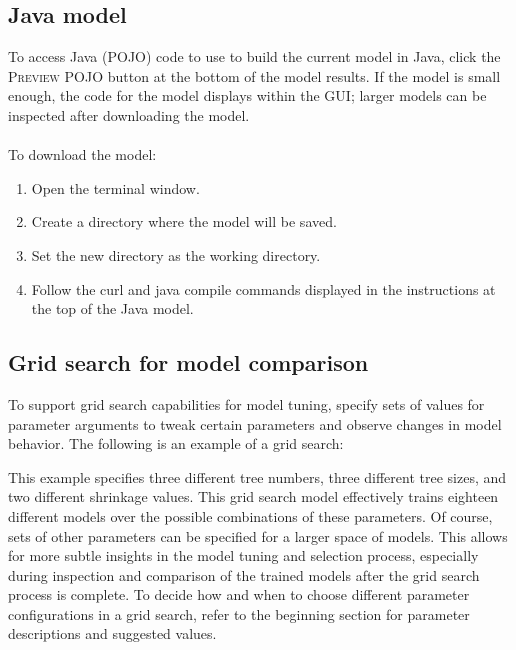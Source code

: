 \subsection{Java model}

To access Java (POJO) code to use to build the current model in Java, click the \textsc{Preview POJO} button at the
bottom of the model results. If the model is small enough, the code for the model displays within the GUI; larger
models can be inspected after downloading the model.
\\
\\
To download the model:
\begin{enumerate}
\item Open the terminal window.
\item Create a directory where the model will be saved.
\item Set the new directory as the working directory.
\item Follow the curl and java compile commands displayed in the instructions at the top of the Java model.
\end{enumerate}


\subsection{Grid search for model comparison}

To support grid search capabilities for model tuning,  specify sets of values for parameter arguments to tweak
certain parameters and observe changes in model behavior. The following is an example of a grid search:

\waterExampleInR


This example specifies three different tree numbers, three different tree sizes, and two different shrinkage values.
This grid search model effectively trains eighteen different models over the possible combinations of these parameters.
Of course, sets of other parameters can be specified for a larger space of models. This allows for more subtle
insights in the model tuning and selection process, especially during inspection and comparison of the trained
models after the grid search process is complete. To decide how and when to choose different parameter configurations
in a grid search, refer to the beginning section for parameter descriptions and suggested values.

\waterExampleInR


